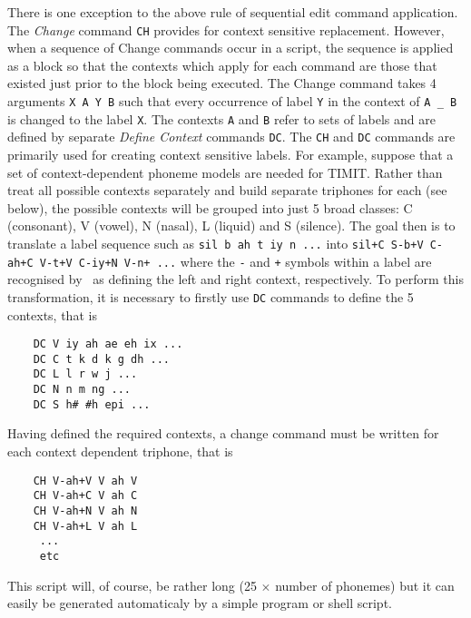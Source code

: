 There is one exception to the above rule of sequential edit command
application.  The {\it Change} command 
\texttt{CH} provides for context
sensitive replacement.  However, when a sequence of Change commands occur
in a script, the sequence is applied as a block so that the contexts
which apply for each command are those that existed just prior to the
block being executed. The Change command takes 4 arguments \texttt{X A Y
B} such that every occurrence of label \texttt{Y} in the context of
\texttt{A \_ B} is changed to the label \texttt{X}.  The contexts
\texttt{A} and \texttt{B} refer to sets of labels and  are defined by
separate \textit{Define Context} commands \texttt{DC}.   
The \texttt{CH} and
\texttt{DC} commands are primarily used for creating context sensitive
labels.  For example, suppose that a set of context-dependent phoneme
models are needed for TIMIT.  Rather than treat all possible contexts
separately and build separate triphones for each  (see below), the
possible contexts  will be grouped into just 5 broad classes: C
(consonant), V (vowel), N (nasal), L (liquid) and S (silence). The goal
then is to translate a label sequence such as \texttt{sil b ah t iy n ...}
into \texttt{sil+C S-b+V C-ah+C V-t+V C-iy+N V-n+ ...} where the
\texttt{-} and \texttt{+} symbols within a label are recognised by 
\HTK\ as defining the left and right context, respectively. To perform this
transformation, it is necessary to firstly use \texttt{DC} commands to
define the 5 contexts, that is
\begin{verbatim}
    DC V iy ah ae eh ix ... 
    DC C t k d k g dh ... 
    DC L l r w j ...
    DC N n m ng ...
    DC S h# #h epi ...
\end{verbatim}
Having defined the required contexts, a change command must be
written for each context dependent triphone, that is
\begin{verbatim}
    CH V-ah+V V ah V
    CH V-ah+C V ah C
    CH V-ah+N V ah N
    CH V-ah+L V ah L
     ...
     etc
\end{verbatim}
This script will, of course, be rather long (25 $\times$ number of
phonemes) but it can easily be generated automaticaly 
by a simple program or shell script.

